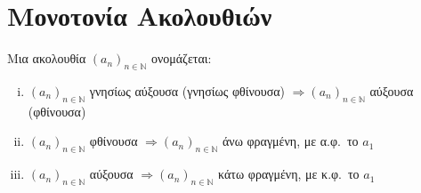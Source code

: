 \section{Μονοτονία Ακολουθιών}

\begin{mybox1}
  \begin{dfn}
    Μια ακολουθία $ (a_{n})_{n \in \mathbb{N}} $ ονομάζεται:
    \begin{enumerate}[i)]
  \end{enumerate}
\end{dfn}
\end{mybox1}

\begin{rems}
\item {}
  \begin{enumerate}[i)]
    \item $ (a_{n})_{n \in \mathbb{N}} $ γνησίως αύξουσα (γνησίως φθίνουσα) $ 
      \Rightarrow (a_{n})_{n \in \mathbb{N}} $ αύξουσα (φθίνουσα) 
    \item $ (a_{n})_{n \in \mathbb{N}} $ φθίνουσα  $ 
      \Rightarrow (a_{n})_{n \in \mathbb{N}} $ άνω φραγμένη, με 
      α.φ.\ το $ a_{1} $  
    \item $ (a_{n})_{n \in \mathbb{N}} $ αύξουσα  $ 
      \Rightarrow (a_{n})_{n \in \mathbb{N}} $ κάτω φραγμένη, με 
      κ.φ.\ το $ a_{1} $  
  \end{enumerate}
\end{rems}


